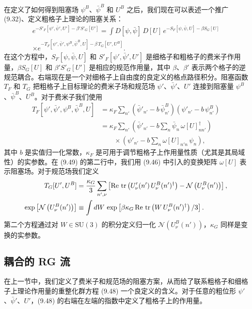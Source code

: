 在定义了如何得到阻塞场 $\psi^B$、$\bar\psi^B$ 和 $U^B$ 之后，我们现在可以表述一个推广 (9.32)、定义粗格子上理论的阻塞关系：
\begin{multline}
  e^{-S'_F[\psi',\bar\psi',U'] - \beta' S'_G[U']}
  = \int D[\psi,\bar\psi]\,D[U]\,e^{-S_F[\psi,\bar\psi,U] - \beta S_G[U]} \\
  \times e^{-T_F[\psi',\bar\psi',\psi^B,\bar\psi^B,U] - \beta\,T_G[U',U^B]} .
\end{multline}
在这个方程中，$S_F[\psi,\bar\psi,U]$ 和 $S'_F[\psi',\bar\psi',U']$ 是细格子和粗格子的费米子作用量，$\beta S_G[U]$ 和 $\beta' S'_G[U']$ 是相应的规范作用量，其中 $\beta$、$\beta'$ 表示两个格子的逆规范耦合。右端现在是一个对细格子上自由度的良定义的格点路径积分。阻塞函数 $T_F$ 和 $T_G$ 把粗格子上目标理论的费米子场和规范场 $\psi'$、$\bar\psi'$、$U'$ 连接到阻塞量 $\psi^B$、$\bar\psi^B$、$U^B$。对于费米子我们使用
\begin{align}
  T_F[\psi',\bar\psi',\psi^B,\bar\psi^B,U]
  &= \kappa_F\sum_{n'}\left(\bar\psi'_{n'} - b\,\bar\psi^B_{n'}\right)
     \left(\psi'_{n'} - b\,\psi^B_{n'}\right) \nonumber\\
  &= \kappa_F\sum_{n'}\left(\bar\psi'_{n'} - b\sum_n\bar\psi_n\,\omega[U]^\dagger_{nn'}\right) \nonumber\\
  &\qquad \times\left(\psi'_{n'} - b\sum_n\omega[U]_{n'n}\,\psi_n\right) ,
\end{align}
其中 $b$ 是实值归一化常数，$\kappa_F$ 是可用于调节粗格子上作用量性质（尤其是其局域性）的实参数。在 (9.49) 的第二行中，我们用 (9.46) 中引入的变换矩阵 $\omega[U]$ 表示阻塞场。对于规范场我们定义
\begin{align}
  T_G[U',U^B] &= \frac{\kappa_G}{3}\sum_{n',\nu}
    \left[\mathrm{Re}\,\operatorname{tr}\left(U'_\nu(n')\,U^B_\nu(n')^\dagger\right)
      - \mathcal{N}\left(U^B_\nu(n')\right)\right] , \nonumber\\
  \exp\left[\mathcal{N}\left(U^B_\nu(n')\right)\right]
  &\equiv \int dW\,\exp\left[\beta\kappa_G\,\mathrm{Re}\,\operatorname{tr}\left(W\,U^B_\nu(n')^\dagger\right)/3\right] .
\end{align}
第二个方程通过对 $W \in \mathrm{SU}(3)$ 的积分定义归一化 $\mathcal{N}(U^B_\nu(n'))$，$\kappa_G$ 同样是变换的实参数。

\subsection{耦合的 RG 流}
\label{sec:9.3.2}

在上一节中，我们定义了费米子和规范场的阻塞方案，从而给了联系粗格子和细格子上理论作用量的重整化群方程 (9.48) 一个良定义的含义。对于任意的粗位形 $\psi'$、$\bar\psi'$、$U'$，(9.48) 的右端在左端的指数中定义了粗格子上的作用量。

